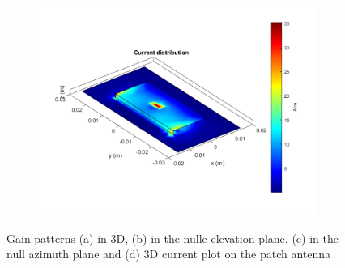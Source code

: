 \documentclass[12pt,a4paper]{article}
\begin{document}
{\begin{figure}[h]
\begin{center}
\begin{subfigure}{0.5\linewidth}
	\includegraphics[scale=0.5]{pifa_currents.pdf}
	\caption{} \end{subfigure}
		\caption{\selectfont
			\color{gray}
		Gain patterns (a) in 3D, (b) in the nulle elevation plane, (c) in the null azimuth plane and (d) 3D current plot on the patch antenna }
	\end{center}  
\end{figure}

}
\end{document}
